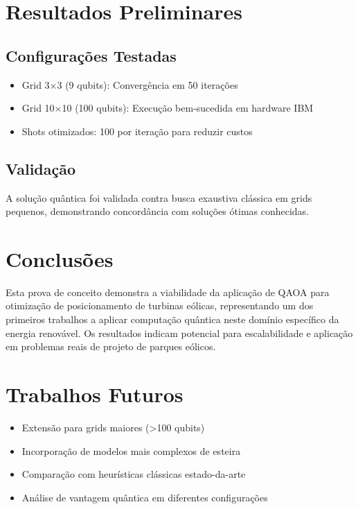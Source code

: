 \documentclass[12pt,a4paper]{article}
\begin{document}
\section{Resultados Preliminares}

\subsection{Configurações Testadas}
\begin{itemize}
    \item Grid 3×3 (9 qubits): Convergência em 50 iterações
    \item Grid 10×10 (100 qubits): Execução bem-sucedida em hardware IBM
    \item Shots otimizados: 100 por iteração para reduzir custos
\end{itemize}

\subsection{Validação}
A solução quântica foi validada contra busca exaustiva clássica em grids pequenos, demonstrando concordância com soluções ótimas conhecidas.

\section{Conclusões}

Esta prova de conceito demonstra a viabilidade da aplicação de QAOA para otimização de posicionamento de turbinas eólicas, representando um dos primeiros trabalhos a aplicar computação quântica neste domínio específico da energia renovável. Os resultados indicam potencial para escalabilidade e aplicação em problemas reais de projeto de parques eólicos.

\section{Trabalhos Futuros}

\begin{itemize}
    \item Extensão para grids maiores (>100 qubits)
    \item Incorporação de modelos mais complexos de esteira
    \item Comparação com heurísticas clássicas estado-da-arte
    \item Análise de vantagem quântica em diferentes configurações
\end{itemize}



\end{document}
